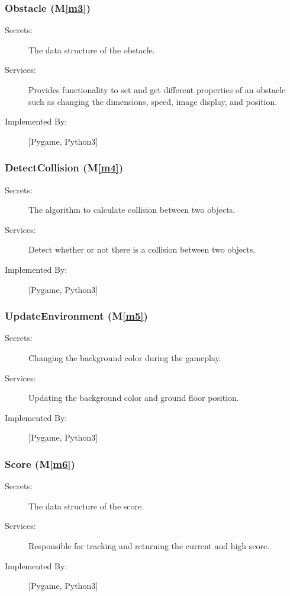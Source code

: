 \documentclass[12pt, titlepage]{article}
\newcommand{\mref}[1]{M\ref{#1}}
\begin{document}
\subsubsection{Obstacle (\mref{m3})}
\begin{description}
\item[Secrets:] The data structure of the obstacle.
\item[Services:] Provides functionality to set and get different properties of an obstacle such as changing the dimensions, speed, image display, and position.
\item[Implemented By:] [Pygame, Python3]
\end{description}

\subsubsection{DetectCollision (\mref{m4})}
\begin{description}
\item[Secrets:]The algorithm to calculate collision between two objects.
\item[Services:] Detect whether or not there is a collision between two objects.
\item[Implemented By:] [Pygame, Python3]
\end{description}

\subsubsection{UpdateEnvironment (\mref{m5})}
\begin{description}
\item[Secrets:] Changing the background color during the gameplay.
\item[Services:] Updating the background color and ground floor position. 
\item[Implemented By:] [Pygame, Python3]
\end{description}

\subsubsection{Score (\mref{m6})}
\begin{description}
\item[Secrets:] The data structure of the score.
\item[Services:] Responsible for tracking and returning the current and high score.
\item[Implemented By:] [Pygame, Python3]
\end{description}
\end{document}
